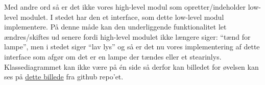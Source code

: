 
Med andre ord så er det ikke vores high-level modul som opretter/indeholder low-level modulet. I stedet har den et interface, som dette low-level modul implementere.
På denne måde kan den underliggende funktionalitet let ændres/skiftes ud senere fordi high-level modulet ikke længere siger: “tænd for lampe”, men i stedet siger “lav lys” og så er det nu vores implementering af dette interface som afgør om det er en lampe der tændes eller et stearinlys.\\ 

Klassediagrammet kan ikke være på én side så derfor kan billedet for øvelsen kan ses på  \href{https://raw.githubusercontent.com/BjornNorgaard/I4SWD/bdd4a11a87f182d81b3ed81409a2052e45be82c3/Eksamen/Disposition/figs/compressionstockings_classdiagram.PNG}{dette billede} fra github repo'et.